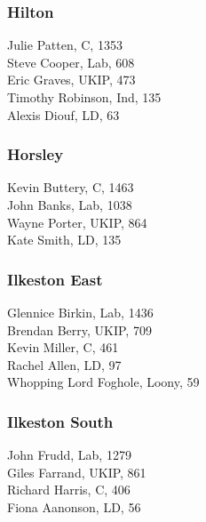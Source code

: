 \documentclass[a4paper,openany,10pt]{book}
\begin{document}
\subsubsection*{Hilton}



Julie Patten, C, 1353\\
Steve Cooper, Lab, 608\\
Eric Graves, UKIP, 473\\
Timothy Robinson, Ind, 135\\
Alexis Diouf, LD, 63\\


\subsubsection*{Horsley}



Kevin Buttery, C, 1463\\
John Banks, Lab, 1038\\
Wayne Porter, UKIP, 864\\
Kate Smith, LD, 135\\


\subsubsection*{Ilkeston East}



Glennice Birkin, Lab, 1436\\
Brendan Berry, UKIP, 709\\
Kevin Miller, C, 461\\
Rachel Allen, LD, 97\\
Whopping Lord Foghole, Loony, 59\\


\subsubsection*{Ilkeston South}



John Frudd, Lab, 1279\\
Giles Farrand, UKIP, 861\\
Richard Harris, C, 406\\
Fiona Aanonson, LD, 56\\
\end{document}
